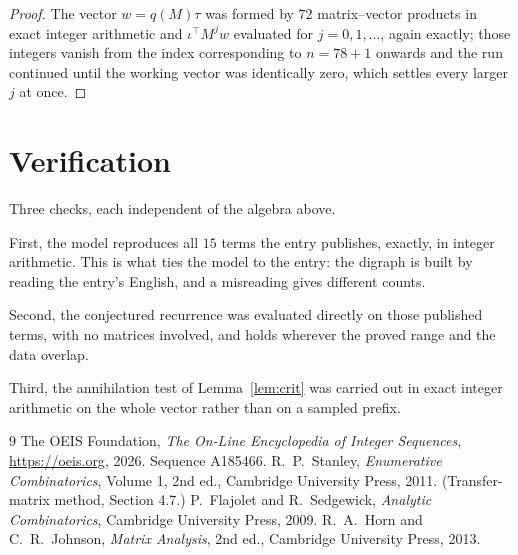 \documentclass[11pt,a4paper]{article}
\theoremstyle{plain}
\theoremstyle{definition}
\begin{document}
\begin{proof}
The vector $w=q(M)\tau$ was formed by $72$ matrix--vector products in exact integer
arithmetic and $\iota^{\!\top}M^{j}w$ evaluated for $j=0,1,\dots$, again exactly; those
integers vanish from the index corresponding to $n=78+1$ onwards and the run continued
until the working vector was identically zero, which settles every larger $j$ at once.
\end{proof}

\section{Verification}

Three checks, each independent of the algebra above.

First, the model reproduces all $15$ terms the entry publishes, exactly, in integer
arithmetic. This is what ties the model to the entry: the digraph is built by reading the
entry's English, and a misreading gives different counts.

Second, the conjectured recurrence was evaluated directly on those published terms, with no
matrices involved, and holds wherever the proved range and the data overlap.

Third, the annihilation test of Lemma~\ref{lem:crit} was carried out in exact integer
arithmetic on the whole vector rather than on a sampled prefix.

\begin{thebibliography}{9}
 The OEIS Foundation, \emph{The On-Line Encyclopedia of Integer
Sequences}, \url{https://oeis.org}, 2026. Sequence A185466.
 R.~P.~Stanley, \emph{Enumerative Combinatorics}, Volume 1, 2nd ed.,
Cambridge University Press, 2011. (Transfer-matrix method, Section 4.7.)
 P.~Flajolet and R.~Sedgewick, \emph{Analytic Combinatorics}, Cambridge
University Press, 2009.
 R.~A.~Horn and C.~R.~Johnson, \emph{Matrix Analysis}, 2nd ed., Cambridge
University Press, 2013.
\end{thebibliography}
\end{document}
